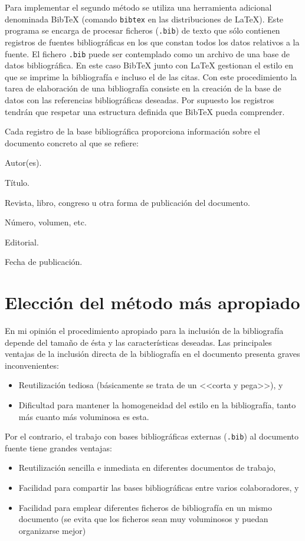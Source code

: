 \documentclass[11pt,a4paper]{article}
\begin{document}
Para implementar el segundo método se utiliza una herramienta adicional denominada Bib\TeX{} (comando \texttt{bibtex} en las distribuciones de \LaTeX). Este programa se encarga de procesar ficheros (\texttt{.bib}) de texto que sólo contienen registros de fuentes bibliográficas en los que constan todos los datos relativos a la fuente. El fichero \texttt{.bib} puede ser contemplado como un archivo de una base de datos bibliográfica. En este caso Bib\TeX{} junto con \LaTeX{} gestionan el estilo en que se imprime la bibliografía e incluso el de las citas. Con este procedimiento la tarea de elaboración de una bibliografía consiste en la creación de la base de datos con las referencias bibliográficas deseadas. Por supuesto los registros tendrán que respetar una estructura definida que Bib\TeX{} pueda comprender.

Cada registro de la base bibliográfica proporciona información sobre el documento concreto al que se refiere:
\begin{compactitem}
	\item Autor(es).
	\item Título.
	\item Revista, libro, congreso u otra forma de publicación del documento.
	\item Número, volumen, etc.
	\item Editorial.
	\item Fecha de publicación.
\end{compactitem}



\section{Elección del método más apropiado}
En mi opinión el procedimiento apropiado para la inclusión de la bibliografía depende del tamaño de ésta y las características deseadas. Las principales ventajas de la inclusión directa de la bibliografía en el documento presenta graves inconvenientes: 
\begin{itemize}
	\item Reutilización tediosa (básicamente se trata de un <<corta y pega>>), y
	\item Dificultad para mantener la homogeneidad del estilo en la bibliografía, tanto más cuanto más voluminosa es esta.
\end{itemize}

Por el contrario, el trabajo con bases bibliográficas externas (\texttt{.bib}) al documento fuente tiene grandes ventajas:
\begin{itemize}
	\item Reutilización sencilla e inmediata en diferentes documentos de trabajo,
	\item Facilidad para compartir las bases bibliográficas entre varios colaboradores, y
	\item Facilidad para emplear diferentes ficheros de bibliografía en un mismo documento (se evita que los ficheros sean muy voluminosos y puedan organizarse mejor)
\end{itemize}
\end{document}
